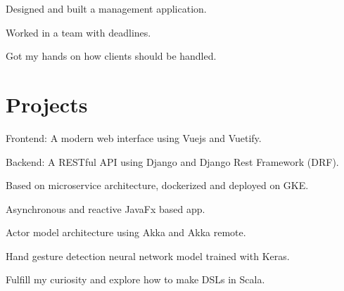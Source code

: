 \documentclass[]{plushcv}
\begin{document}
\begin{minipage}[t]{0.70\textwidth}
\begin{tightemize}
\sectionsep
\item Designed and built a management application.
\item Worked in a team with deadlines.
\item Got my hands on how clients should be handled.
\end{tightemize}
\sectionsep



\section{Projects}

\begin{tightemize}
\sectionsep
\item Frontend: A modern web interface using Vuejs and Vuetify.
\item Backend: A RESTful API using Django and Django Rest Framework (DRF).
\item Based on microservice architecture, dockerized and deployed on GKE.
\end{tightemize}
\sectionsep
\sectionsep

\begin{tightemize}
\sectionsep
\item Asynchronous and reactive JavaFx based app.
\item Actor model architecture using Akka and Akka remote.
\item Hand gesture detection neural network model trained with Keras.
\end{tightemize}
\sectionsep
\sectionsep

\begin{tightemize}
\sectionsep
\item Fulfill my curiosity and explore how to make DSLs in Scala.
\end{tightemize}



\end{minipage}
\end{document}
